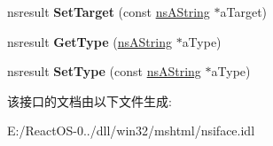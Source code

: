 \begin{DoxyCompactItemize}
nsresult {\bfseries Set\+Target} (const \hyperlink{structns_string_container}{ns\+A\+String} $\ast$a\+Target)
\item 
\mbox{\label{interfacens_i_d_o_m_h_t_m_l_link_element_a62e0926f5f87cc3bb2aed719e9e39dd8}} 
nsresult {\bfseries Get\+Type} (\hyperlink{structns_string_container}{ns\+A\+String} $\ast$a\+Type)
\item 
\mbox{\label{interfacens_i_d_o_m_h_t_m_l_link_element_af3c0444cd110929222b449fff8d7ca14}} 
nsresult {\bfseries Set\+Type} (const \hyperlink{structns_string_container}{ns\+A\+String} $\ast$a\+Type)
\end{DoxyCompactItemize}


该接口的文档由以下文件生成\+:\begin{DoxyCompactItemize}
\item 
E\+:/\+React\+O\+S-\/0../dll/win32/mshtml/nsiface.\+idl\end{DoxyCompactItemize}
